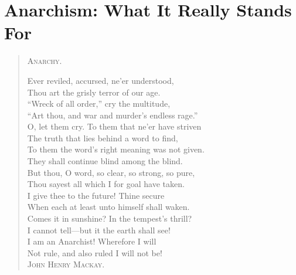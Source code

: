 
\author{Emma Goldman}
\chapter{Anarchism: What It Really Stands For}


\begin{verse}
\begin{center}\textsc{Anarchy}.\end{center}
Ever reviled, accursed, ne'er understood,\\
\hspace{1.1em}  Thou art the grisly terror of our age.\\
``Wreck of all order,'' cry the multitude,\\
\hspace{1.1em} ``Art thou, and war and murder's endless rage.''\\
O, let them cry. To them that ne'er have striven\\
\hspace{1.1em} The truth that lies behind a word to find,\\
To them the word's right meaning was not given.\\
\hspace{1.1em} They shall continue blind among the blind.\\
But thou, O word, so clear, so strong, so pure,\\
\hspace{1.1em} Thou sayest all which I for goal have taken.\\
I give thee to the future! Thine secure\\
\hspace{1.1em} When each at least unto himself shall waken.\\
Comes it in sunshine? In the tempest's thrill?\\
\hspace{1.1em} I cannot tell---but it the earth shall see!\\
I am an Anarchist! Wherefore I will\\
\hspace{1.1em} Not rule, and also ruled I will not be!\\
\hfil\hfil\textsc{John Henry Mackay}.
\end{verse}

